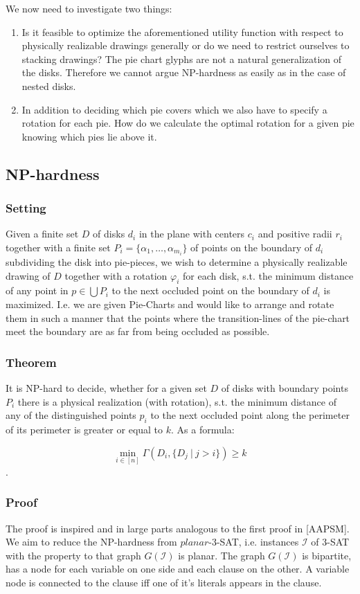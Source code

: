 \documentclass[a4paper,11pt]{article}
\begin{document}
We now need to investigate two things:

\begin{enumerate}
  \item Is it feasible to optimize the aforementioned utility function with respect to physically realizable drawings generally or do we need to restrict ourselves to stacking drawings? The pie chart glyphs are not a natural generalization of the disks. Therefore we cannot argue NP-hardness as easily as in the case of nested disks.
  \item In addition to deciding which pie covers which we also have to specify a rotation for each pie. How do we calculate the optimal rotation for a given pie knowing which pies lie above it.
\end{enumerate}

\subsection{NP-hardness}
\subsubsection*{Setting}
Given a finite set $D$ of disks $d_i$ in the plane with centers $c_i$ and positive radii $r_i$ together with a finite set $P_i = \{ \alpha_1, \dots, \alpha_{m_i}\}$ of points on the boundary of $d_i$ subdividing the disk into pie-pieces, we wish to determine a physically realizable drawing of $D$ together with a rotation $\varphi_i$ for each disk, s.t. the minimum distance of any point in $p\in\bigcup P_i$ to the next occluded point on the boundary of $d_i$ is maximized.
I.e. we are given Pie-Charts and would like to arrange and rotate them in such a manner that the points where the transition-lines of the pie-chart meet the boundary are as far from being occluded as possible.

\subsubsection*{Theorem}
It is NP-hard to decide, whether for a given set $D$ of disks with boundary points $P_i$ there is a physical realization (with rotation), s.t. the minimum distance of any of the distinguished points $p_i$ to the next occluded point along the perimeter of its perimeter is greater or equal to $k$. As a formula:

\[\min_{i\in [n]} \Gamma(D_i,\{D_j\ |\ j>i\}) \geq k\].

\subsubsection{Proof}
The proof is inspired and in large parts analogous to the first proof in [AAPSM].
We aim to reduce the NP-hardness from $planar$-3-SAT, i.e. instances $\mathcal{I}$ of 3-SAT with the property to that graph $G(\mathcal{I})$ is planar.
The graph $G(\mathcal{I})$ is bipartite, has a node for each variable on one side and each clause on the other. A variable node is connected to the clause iff one of it's literals appears in the clause.
\end{document}
